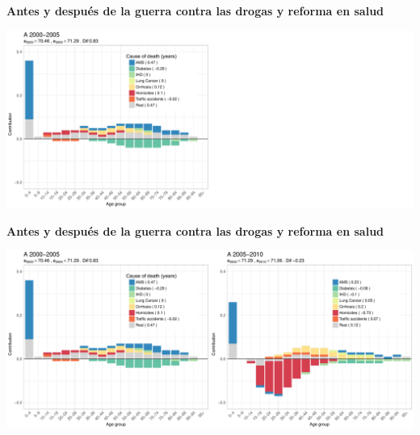 \documentclass[xcolor={dvipsnames}]{beamer}
\begin{document}
\begin{frame}
\begin{center}
\Large{\textbf{Antes y despu\'es de la guerra contra las drogas y reforma en salud}}
\end{center}

\hspace*{-1cm}   
\includegraphics[scale=.31]{Figures/Fig2_1}

\end{frame}

\begin{frame}
\begin{center}
\Large{\textbf{Antes y despu\'es de la guerra contra las drogas y reforma en salud}}
\end{center}

\hspace*{-1cm}   
\includegraphics[scale=.31]{Figures/Fig2_2}

\end{frame}
\end{document}
